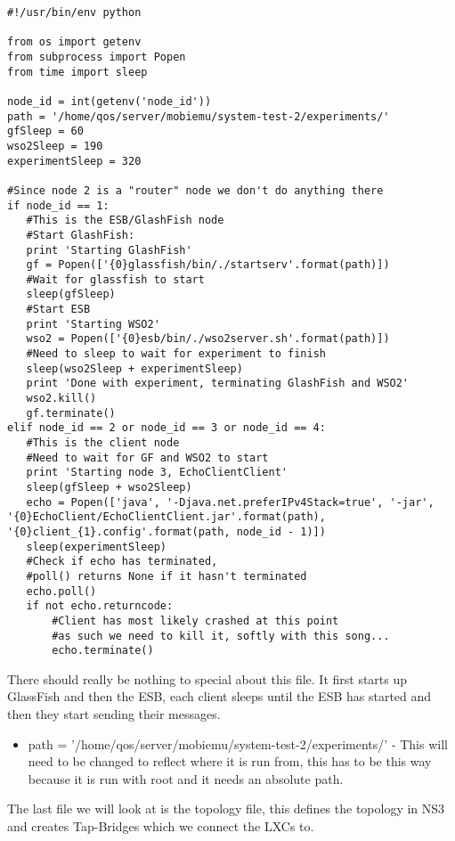 \lstset{language=Python}
\begin{lstlisting}[frame=single, caption={System-test-2.py}, label=mobiemu:system-test-2.py, breaklines=true]
#!/usr/bin/env python

from os import getenv
from subprocess import Popen
from time import sleep

node_id = int(getenv('node_id'))
path = '/home/qos/server/mobiemu/system-test-2/experiments/'
gfSleep = 60
wso2Sleep = 190
experimentSleep = 320

#Since node 2 is a "router" node we don't do anything there
if node_id == 1:
   #This is the ESB/GlashFish node
   #Start GlashFish:
   print 'Starting GlashFish'
   gf = Popen(['{0}glassfish/bin/./startserv'.format(path)])
   #Wait for glassfish to start
   sleep(gfSleep)
   #Start ESB
   print 'Starting WSO2'
   wso2 = Popen(['{0}esb/bin/./wso2server.sh'.format(path)])
   #Need to sleep to wait for experiment to finish
   sleep(wso2Sleep + experimentSleep)    
   print 'Done with experiment, terminating GlashFish and WSO2'
   wso2.kill()
   gf.terminate()
elif node_id == 2 or node_id == 3 or node_id == 4:
   #This is the client node
   #Need to wait for GF and WSO2 to start
   print 'Starting node 3, EchoClientClient'
   sleep(gfSleep + wso2Sleep)
   echo = Popen(['java', '-Djava.net.preferIPv4Stack=true', '-jar', '{0}EchoClient/EchoClientClient.jar'.format(path), '{0}client_{1}.config'.format(path, node_id - 1)])
   sleep(experimentSleep)
   #Check if echo has terminated,
   #poll() returns None if it hasn't terminated
   echo.poll()
   if not echo.returncode:
       #Client has most likely crashed at this point
       #as such we need to kill it, softly with this song...
       echo.terminate()
\end{lstlisting}

There should really be nothing to special about this file. It first starts up GlassFish and then the ESB, each client sleeps until the ESB has started and then they start sending their messages.

\begin{itemize}\label{mobiemu:system-test-2.py changes}
\item path = '/home/qos/server/mobiemu/system-test-2/experiments/' - This will need to be changed to reflect where it is run from, this has to be this way because it is run with root and it needs an absolute path.
\end{itemize}

The last file we will look at is the topology file, this defines the topology in NS3 and creates Tap-Bridges which we connect the LXCs to.

